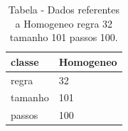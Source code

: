 \begin{table}[H]
\centering
\caption{Tabela - Dados referentes a Homogeneo regra 32 tamanho 101 passos 100.}
\label{tab:Homogeneo_regra_32_tamanho_101_passos_100}
\begin{tabular}{ll}
\toprule
classe & Homogeneo \\
\midrule
regra & 32 \\
tamanho & 101 \\
passos & 100 \\
\bottomrule
\end{tabular}

\end{table}
